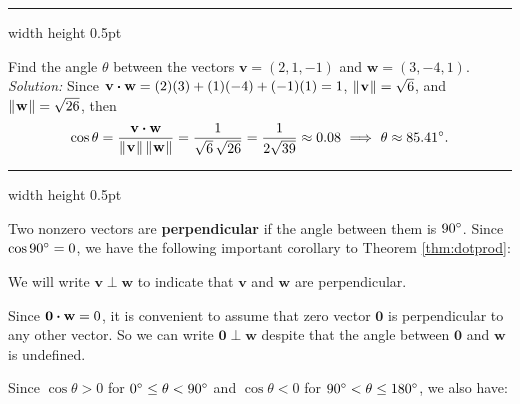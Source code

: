 \hrule width \textwidth height 0.5pt
\begin{exmp}
 Find the angle $\theta$ between the vectors $\mathbf{v} = (2,1,-1)$ and $\mathbf{w} =
 (3,-4,1)$.\smallskip
 \\\emph{Solution:}
 Since $\mathbf{v} \bm{\cdot} \mathbf{w} = (2)(3) + (1)(-4) + (-1)(1) = 1$,
 $\lVert\mspace{1mu}\mathbf{v}\mspace{1mu}\rVert = \sqrt{6}$, and $\lVert\mspace{1mu}\mathbf{w}\mspace{1mu}\rVert = \sqrt{26}$, then
 \begin{displaymath}
  \cos \theta = \frac{\mathbf{v} \bm{\cdot} \mathbf{w}}{\lVert\mspace{1mu}\mathbf{v}\mspace{1mu}\rVert \, \lVert\mspace{1mu}\mathbf{w}\mspace{1mu}\rVert} =
  \frac{1}{\sqrt{6}\,\sqrt{26}} = \frac{1}{2 \sqrt{39}} \approx 0.08 ~ \Longrightarrow ~ \theta \approx 85.41^\circ.
 \end{displaymath}
\end{exmp}
\hrule width \textwidth height 0.5pt
\smallskip

Two nonzero vectors are \textbf{perpendicular} if the angle between them is $90^\circ$.
Since $\cos 90^\circ = 0$, we have the following important corollary to Theorem \ref{thm:dotprod}:


We will write $\mathbf{v} \perp \mathbf{w}$ to indicate that $\mathbf{v}$ and $\mathbf{w}$ are perpendicular.

Since $\mathbf{0} \bm{\cdot} \mathbf{w} =
 0$, it is convenient to assume that zero vector $\mathbf{0}$ is perpendicular to any other vector. 
So we can write  $\mathbf{0} \perp \mathbf{w}$ despite that the angle between $\mathbf{0}$ and $\mathbf{w}$ is undefined.

Since $\cos \theta > 0$ for $0^\circ \le \theta < 90^\circ$ and $\cos \theta < 0$ for
$90^\circ < \theta \le 180^\circ$, we also have:


